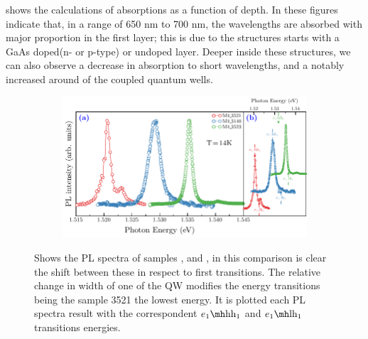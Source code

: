  shows the calculations of absorptions as a function of depth. In these figures indicate that,  in a range of 650 nm to 700 nm, the wavelengths are absorbed with major proportion in the first layer;  this is due to the structures starts with a GaAs doped(n- or p-type) or undoped layer. Deeper inside these structures, we can also observe a
decrease in absorption to short wavelengths, and a notably increased around of the coupled quantum wells.
\begin{figure}[hbtp!]
	\centering
	\begin{subfigure}{\textwidth}
		\includegraphics[width=\textwidth]{../figures/chapter-3/pl-plots/build-ruco/pl-2}
		\label{subfig:chapter-3-PL-experiments-M4_3140-M4_3521-M4_3523-a)}
		\label{subfig:chapter-3-PL-experiments-M4_3140-M4_3521-M4_3523-b)}
	\end{subfigure}
	\caption{ Shows the PL spectra of samples ,  and , in this comparison is clear the shift  between these in respect to first transitions. The relative change in width of one of the QW modifies the  energy transitions being the sample 3521 the lowest energy.  It is plotted  each PL spectra result with the correspondent $\thh{1}{1}$ and $\tlh{1}{1}$ transitions energies. }
	\label{fig:chapter-3-PL-experiments-M4_3140-M4_3521-M4_3523}
\end{figure}

